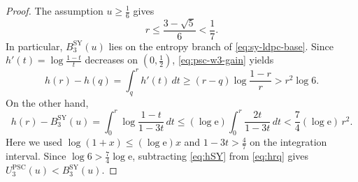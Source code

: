 \documentclass[10pt,a4paper]{amsart}
\newcommand{\PSC}{\mathrm{PSC}}
\renewcommand{\geq}{\geqslant}
\renewcommand{\leq}{\leqslant}
\begin{document}
\begin{proof}
The assumption $u \geq \frac{1}{6}$ gives
\begin{equation*}
r
\leq
\frac{3-\sqrt{5}}{6}
< \frac{1}{7}.
\end{equation*}
In particular, $B_3^{\mathrm{SY}}(u)$ lies on the entropy branch of \eqref{eq:sy-ldpc-base}. Since $h'(t) = \log\frac{1-t}{t}$ decreases on $(0,\frac{1}{2})$, \eqref{eq:psc-w3-gain} yields
\begin{equation}
\label{eq:hrq}
h(r)-h(q)
=\int_q^r h'(t)\,dt
\geq(r-q)\log\frac{1-r}{r}
>r^2\log{6}.
\end{equation}
On the other hand,
\begin{equation}
\label{eq:hSY}
h(r)-B_3^{\mathrm{SY}}(u)
=\int_0^r\log\frac{1-t}{1-3t}\,dt
\leq(\log{\mathrm e})\int_0^r\frac{2t}{1-3t}\,dt
<\frac{7}{4}(\log{\mathrm e})\,r^2.
\end{equation}
Here we used $\log(1+x) \leq (\log{\mathrm e})x$ and $1-3t > \frac{4}{7}$ on the integration interval. Since $\log{6} > \frac{7}{4}\log{\mathrm e}$, subtracting \eqref{eq:hSY} from \eqref{eq:hrq} gives $U_3^{\PSC}(u) < B_3^{\mathrm{SY}}(u)$.
\end{proof}
\end{document}
